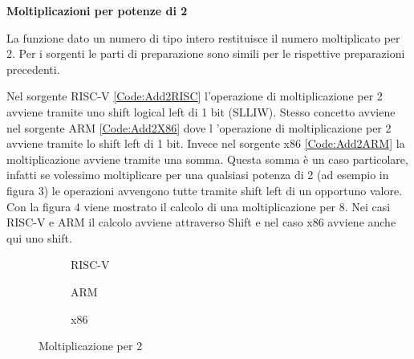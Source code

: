 \documentclass[12pt,a4paper]{report}
\begin{document}
\vspace{0.3 cm}
\textbf{Moltiplicazioni per potenze di 2}



La funzione dato un numero di tipo intero restituisce il numero moltiplicato per 2.  Per i sorgenti le parti di preparazione sono simili per le rispettive preparazioni precedenti.



\vspace{0.3 cm}
Nel sorgente RISC-V \ref{Code:Add2RISC} l'operazione di moltiplicazione per 2 avviene tramite uno shift logical left di 1 bit (SLLIW). Stesso concetto avviene nel sorgente ARM \ref{Code:Add2X86} dove l 'operazione di moltiplicazione per 2 avviene tramite lo shift left di 1 bit. Invece nel sorgente x86 \ref{Code:Add2ARM} la moltiplicazione avviene tramite una somma. Questa somma è un caso particolare, infatti se volessimo moltiplicare per una qualsiasi potenza di 2 (ad esempio in figura 3) le operazioni avvengono tutte tramite shift left di un opportuno valore. Con la figura 4 viene mostrato il calcolo di una moltiplicazione per 8. Nei casi RISC-V e ARM il calcolo avviene attraverso Shift e nel caso x86 avviene anche qui uno shift.


\vspace{0.3 cm}

\begin{figure}
     
     \begin{subfigure}[b]{0.3\textwidth}
  
        
        
	\caption{RISC-V}
	\label{Code:Mul2RISC}
     \end{subfigure}
     \hfill
     \begin{subfigure}[b]{0.3\textwidth}
         
          	
		\caption{ARM}
		\label{Code:Mul2ARM}
     \end{subfigure}
     \hfill
     \begin{subfigure}[b]{0.3\textwidth}
         
          
	 \caption{x86}
	\label{Code:Mul2X86}
     \end{subfigure}
     \caption{Moltiplicazione per 2}
     \end{figure}
 	
\end{document}
